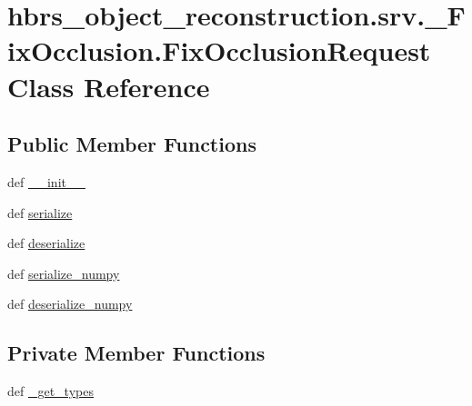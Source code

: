 \hypertarget{classhbrs__object__reconstruction_1_1srv_1_1___fix_occlusion_1_1_fix_occlusion_request}{\section{hbrs\-\_\-object\-\_\-reconstruction.\-srv.\-\_\-\-Fix\-Occlusion.\-Fix\-Occlusion\-Request \-Class \-Reference}
\label{classhbrs__object__reconstruction_1_1srv_1_1___fix_occlusion_1_1_fix_occlusion_request}
}
\subsection*{\-Public \-Member \-Functions}
\begin{DoxyCompactItemize}
\item 
def \hyperlink{classhbrs__object__reconstruction_1_1srv_1_1___fix_occlusion_1_1_fix_occlusion_request_a80c53a79b67d8cbb534a2c98dc980c7d}{\-\_\-\-\_\-init\-\_\-\-\_\-}
\item 
def \hyperlink{classhbrs__object__reconstruction_1_1srv_1_1___fix_occlusion_1_1_fix_occlusion_request_a4dd30aca99eb722e310699cd74fb6b7d}{serialize}
\item 
def \hyperlink{classhbrs__object__reconstruction_1_1srv_1_1___fix_occlusion_1_1_fix_occlusion_request_adce06576ae29c16631c9438ed9add7f7}{deserialize}
\item 
def \hyperlink{classhbrs__object__reconstruction_1_1srv_1_1___fix_occlusion_1_1_fix_occlusion_request_acb4a240519b8d3eb31906e002e66f0ba}{serialize\-\_\-numpy}
\item 
def \hyperlink{classhbrs__object__reconstruction_1_1srv_1_1___fix_occlusion_1_1_fix_occlusion_request_a27f69590f830a635bd329b7a882a0cb6}{deserialize\-\_\-numpy}
\end{DoxyCompactItemize}
\subsection*{\-Private \-Member \-Functions}
\begin{DoxyCompactItemize}
\item 
def \hyperlink{classhbrs__object__reconstruction_1_1srv_1_1___fix_occlusion_1_1_fix_occlusion_request_aeea6b8f16e76f34f5db3374e0fb82656}{\-\_\-get\-\_\-types}
\end{DoxyCompactItemize}
